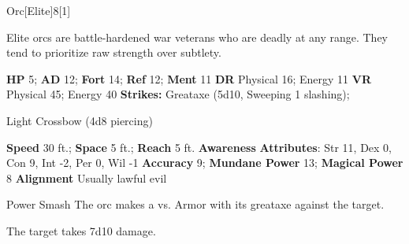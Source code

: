   \begin{monsection}{Orc}[Elite]{8}[1]
    \vspace{-1em}\vspace{-1em}
    \vspace{0em}

    
      Elite orcs are battle-hardened war veterans who are deadly at any range.
      They tend to prioritize raw strength over subtlety.
    
    

    \begin{spellcontent}
      \begin{spelltargetinginfo}
        \pari \textbf{HP} 5;
          \textbf{AD} 12;
          \textbf{Fort} 14;
          \textbf{Ref} 12;
          \textbf{Ment} 11
        \pari \textbf{DR} Physical 16; Energy 11
        \pari \textbf{VR} Physical 45; Energy 40
        \pari \textbf{Strikes:}
            Greataxe  (5d10, Sweeping 1 slashing);
\par Light Crossbow  (4d8 piercing)
      \end{spelltargetinginfo}
    \end{spellcontent}
    \begin{monsterfooter}
      \pari \textbf{Speed} 30 ft.;
        \textbf{Space} 5 ft.;
        \textbf{Reach} 5 ft.
      \pari \textbf{Awareness} 
      \pari \textbf{Attributes}:
        Str 11, Dex 0,
        Con 9, Int -2,
        Per 0, Wil -1
      \pari \textbf{Accuracy} 9;
        \textbf{Mundane Power} 13;
      \textbf{Magical Power} 8
      \pari \textbf{Alignment} Usually lawful evil
    \end{monsterfooter}
  \end{monsection}
  \begin{freeability}{Power Smash}
       The orc makes a 
         vs. Armor
        with its greataxe against the target.
    
    \hit The target takes 7d10  damage.
    \end{freeability}
  
